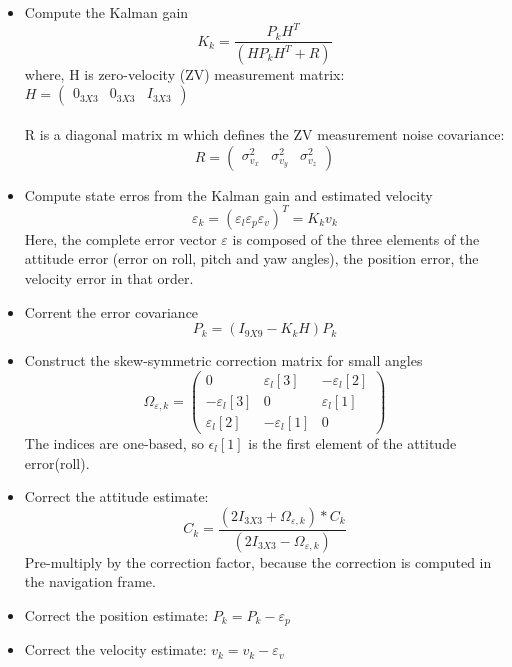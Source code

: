\documentclass[12pt]{article}
\begin{document}
\begin{itemize}
\item Compute the Kalman gain
\begin{equation}
K_k=\frac{P_kH^T}{(HP_kH^T+R)}
\end{equation}
where, H is zero-velocity (ZV) measurement matrix:
$ H = \begin{pmatrix}
0_{3X3} & 0_{3X3} & I_{3X3}
\end{pmatrix} $ \\\\
R is a diagonal matrix m which defines the ZV measurement noise covariance: 
\begin{equation}
R = \begin{pmatrix}
\sigma^2_{v_x} & \sigma^2_{v_y} & \sigma^2_{v_z}
\end{pmatrix}
\end{equation}
\item Compute state erros from the Kalman gain and estimated velocity
\begin{equation}
\varepsilon_k=(\varepsilon_l \varepsilon_p \varepsilon_v)^T = K_kv_k
\end{equation}
Here, the complete error vector $ \varepsilon $   is composed of the three elements of the attitude error (error on roll, pitch and yaw angles), the position error, the velocity error in that order.

\item Corrent the error covariance
\begin{equation}
P_k = (I_{9X9}-K_kH)P_k
\end{equation}

\item Construct the skew-symmetric correction matrix for small angles
\begin{equation}
\Omega_{\varepsilon,k} = \begin{pmatrix}
0 & \varepsilon_l[3] & -\varepsilon_l[2]\\
-\varepsilon_l[3] & 0 & \varepsilon_l[1]\\
\varepsilon_l[2] & -\varepsilon_l[1] & 0
\end{pmatrix}
\end{equation}
The indices are one-based, so $ \epsilon_l[1] $ is the first element of the attitude error(roll).

\item Correct the attitude estimate:
\begin{equation}
C_k = \frac{(2I_{3X3}+\Omega_{\varepsilon,k})*C_k}{(2I_{3X3}-\Omega_{\varepsilon,k})}
\end{equation}
Pre-multiply by the correction factor, because the correction is computed in the navigation frame.

\item Correct the position estimate: $ P_k=P_k-\varepsilon_p $
\item Correct the velocity estimate: $ v_k = v_k-\varepsilon_v $
\end{itemize}
{}

\end{document}
